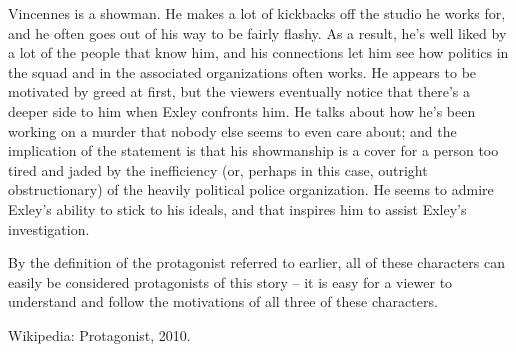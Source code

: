 \documentclass{article}
\begin{document}
Vincennes is a showman. He makes a lot of kickbacks off the studio he works for, and he often goes out of his way to be fairly flashy.
As a result, he's well liked by a lot of the people that know him, and his connections let him see how politics in the squad and in the associated organizations often works.
He appears to be motivated by greed at first, but the viewers eventually notice that there's a deeper side to him when Exley confronts him.
He talks about how he's been working on a murder that nobody else seems to even care about; and the implication of the statement is that his showmanship is a cover for a person too tired and jaded by the inefficiency (or, perhaps in this case, outright obstructionary) of the heavily political police organization. He seems to admire Exley's ability to stick to his ideals, and that inspires him to assist Exley's investigation.

By the definition of the protagonist referred to earlier, all of these characters can easily be considered protagonists of this story -- it is easy for a viewer to understand and follow the motivations of all three of these characters.

\begin{thebibliography}{9}

	Wikipedia: Protagonist, 2010.

\end{thebibliography}
\end{document}
